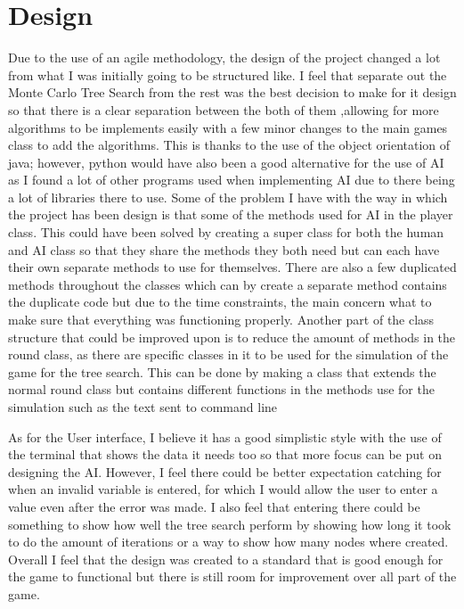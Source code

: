 \section{Design}
Due to the use of an agile methodology, the design of the project changed a lot from what I was initially going to be structured like. I feel that separate out the Monte Carlo Tree Search from the rest was the best decision to make for it design so that there is a clear separation between the both of them ,allowing for more algorithms to be implements easily with a few minor changes to the main games class to add the algorithms. This is thanks to the use of the object orientation of java; however, python would have also been a good alternative for the use of AI as I found a lot of other programs used when implementing AI due to there being a lot of libraries there to use. 
Some of the problem I have with the way in which the project has been design is that some of the methods used for AI in the player class. This could have been solved by creating a super class for both the human and AI class so that they share the methods they both need but can each have their own separate methods to use for themselves. There are also a few duplicated methods throughout the classes which can by create a separate method contains the duplicate code but due to the time constraints, the main concern what to make sure that everything was functioning properly. Another part of the class structure that could be improved upon is to reduce the amount of methods in the round class, as there are specific classes in it to be used for the simulation of the game for the tree search. This can be done by making a class that extends the normal round class but contains different functions in the methods use for the simulation such as the text sent to command line

As for the User interface, I believe it has a good simplistic style with the use of the terminal that shows the data it needs too so that more focus can be put on designing the AI. However, I feel there could be better expectation catching for when an invalid variable is entered, for which I would allow the user to enter a value even after the error was made. I also feel that entering there could be something to show how well the tree search perform by showing how long it took to do the amount of iterations or a way to show how many nodes where created. Overall I feel that the design was created to a standard that is good enough for the game to functional but there is still room for improvement over all part of the game.
